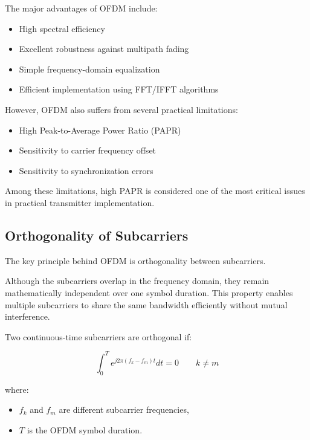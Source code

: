 The major advantages of OFDM include:

\begin{itemize}
    \item High spectral efficiency
    \item Excellent robustness against multipath fading
    \item Simple frequency-domain equalization
    \item Efficient implementation using FFT/IFFT algorithms
\end{itemize}

However, OFDM also suffers from several practical limitations:

\begin{itemize}
    \item High Peak-to-Average Power Ratio (PAPR)
    \item Sensitivity to carrier frequency offset
    \item Sensitivity to synchronization errors
\end{itemize}

Among these limitations, high PAPR is considered one of the most critical
issues in practical transmitter implementation.

\subsection{Orthogonality of Subcarriers}

The key principle behind OFDM is orthogonality between subcarriers.

Although the subcarriers overlap in the frequency domain, they remain
mathematically independent over one symbol duration. This property enables
multiple subcarriers to share the same bandwidth efficiently without
mutual interference.

Two continuous-time subcarriers are orthogonal if:

\begin{equation}
\int_0^T
e^{j2\pi(f_k-f_m)t}dt = 0
\qquad k \neq m
\label{eq:orthogonality}
\end{equation}

where:

\begin{itemize}
    \item $f_k$ and $f_m$ are different subcarrier frequencies,
    \item $T$ is the OFDM symbol duration.
\end{itemize}

